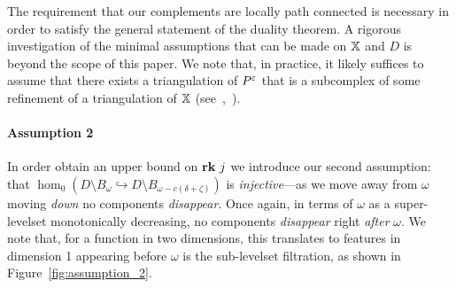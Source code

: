 The requirement that our complements are locally path connected is necessary in order to satisfy the general statement of the duality theorem.
A rigorous investigation of the minimal assumptions that can be made on $\mathbb{X}$ and $D$ is beyond the scope of this paper.
We note that, in practice, it likely suffices to assume that there exists a triangulation of $P^\varepsilon$ that is a subcomplex of some refinement of a triangulation of $\mathbb{X}$ (see~\cite{cavanna2017when},~\cite{julian83alexander}).

\paragraph{Assumption 2}

In order obtain an upper bound on $\mathbf{rk}~j$ we introduce our second assumption: that $\hom_0(D\setminus B_\omega\hookrightarrow D\setminus B_{\omega-c(\delta+\zeta)})$ is \emph{injective}---as we move away from $\omega$ moving \emph{down} no components \emph{disappear}.
Once again, in terms of $\omega$ as a super-levelset monotonically decreasing, no components \emph{disappear} right \emph{after} $\omega$.
We note that, for a function in two dimensions, this translates to features in dimension 1 appearing before $\omega$ is the sub-levelset filtration, as shown in Figure~\ref{fig:assumption_2}.

